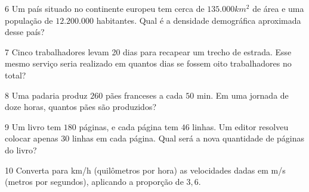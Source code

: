 {{




\num{6} Um país situado no continente europeu tem cerca de $135.000 km^2$ de
área e uma população de $12.200.000$ habitantes. Qual é a densidade
demográfica aproximada desse país?





\num{7} Cinco trabalhadores levam 20 dias para recapear um trecho de estrada. Esse
mesmo serviço seria realizado em quantos dias se fossem oito trabalhadores no
total?







\num{8} Uma padaria produz $260$ pães franceses a cada $50$ min. Em uma jornada
de doze horas, quantos pães são produzidos?






\num{9} Um livro tem $180$ páginas, e cada página tem $46$ linhas. Um editor
resolveu colocar apenas $30$ linhas em cada página. Qual será a nova
quantidade de páginas do livro?







\num{10} Converta para km/h (quilômetros por hora) as velocidades
dadas em m/s (metros por segundos), aplicando a proporção de $3,6$.

}}
